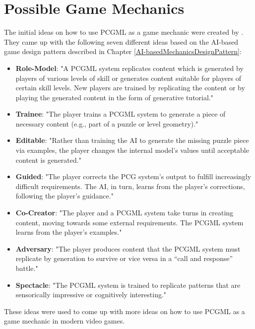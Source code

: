 \documentclass[MGS,Master,english]{twbook}%
\begin{document}
\chapter{Possible Game Mechanics} \label{chapter::possibleGameMechanics}
The initial ideas on how to use PCGML as a game mechanic were created by \citep{pcgml::paper}. They came up with the following seven different ideas based on the AI-based game design pattern described in Chapter \ref{AI-basedMechanicsDesignPattern}:
\begin{itemize}
	\item \textbf{Role-Model}: "A \ac{PCGML} system replicates content which is generated by players of various levels of skill or generates content suitable for players of certain skill levels. New players are trained by replicating the content or by playing the generated content in the form of generative tutorial." \cite[p. 13]{pcgml::paper}
	\item \textbf{Trainee}: "The player trains a \ac{PCGML} system to generate a piece of necessary content (e.g., part of a puzzle or level geometry)." \cite[p. 13]{pcgml::paper}
	\item \textbf{Editable}: "Rather than training the AI to generate the missing puzzle piece via examples, the player changes the internal model’s values until acceptable content is generated." \cite[p. 13]{pcgml::paper}
	\item \textbf{Guided}: "The player corrects the \ac{PCG} system’s output to fulfill increasingly difficult requirements. The \ac{AI}, in turn, learns from the player’s corrections, following the player’s guidance." \cite[p. 13]{pcgml::paper}
	\item \textbf{Co-Creator}: "The player and a \ac{PCGML} system take turns in creating content, moving towards some external requirements. The \ac{PCGML} system learns from the player’s examples." \cite[p. 13]{pcgml::paper}
	\item \textbf{Adversary}: "The player produces content that the \ac{PCGML} system must replicate by generation to survive or vice versa in a “call and response” battle." \cite[p. 13]{pcgml::paper}
	\item \textbf{Spectacle}: "The \ac{PCGML} system is trained to replicate patterns that are sensorically impressive or cognitively interesting." \cite[p. 13]{pcgml::paper}
\end{itemize}
These ideas were used to come up with more ideas on how to use PCGML as a game mechanic in modern video games.
\end{document}
